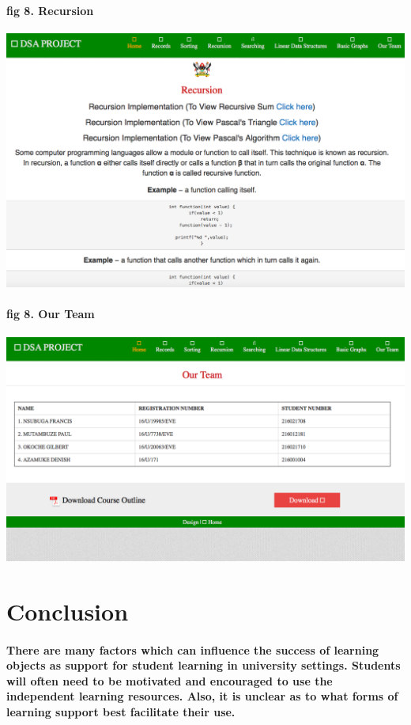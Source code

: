 \documentclass{article}
\begin{document}
\paragraph{fig 8. Recursion}


\includegraphics[width=1.0\textwidth]{./recursion}\\[0.1in]

\paragraph{fig 8. Our Team}


\includegraphics[width=1.0\textwidth]{./team}\\[0.1in]






\section{Conclusion}  
\paragraph{There are many factors which can influence the success of learning objects as support for student learning in university settings. Students will often need to be motivated and encouraged to use the independent learning resources. Also, it is unclear as to what forms of learning support best facilitate their use. }
\end{document}
